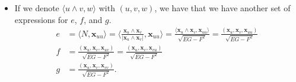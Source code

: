 \documentclass[10pt]{article}
\newcommand{\ve}[1]{\mathbf{#1}}
\begin{document}
\begin{itemize}
    \item If we denote $\langle u \wedge v, w \rangle$ with $(u,v,w)$, we have that we have another set of expressions for $e$, $f$, and $g$.
    \begin{align*}
      e 
      &= \langle N, \ve{x}_{uu} \rangle 
      = \bigg\langle \frac{\ve{x}_u \wedge \ve{x}_v}{|\ve{x}_u \wedge \ve{x}_v|}, \ve{x}_{uu} \bigg\rangle
      = \frac{\langle \ve{x}_u \wedge \ve{x}_v, \ve{x}_{uu} \rangle}{\sqrt{EG-F^2}}
      = \frac{(\ve{x}_u, \ve{x}_v, \ve{x}_{uu})}{\sqrt{EG-F^2}}\\
      f
      &= \frac{(\ve{x}_u, \ve{x}_v, \ve{x}_{uv})}{\sqrt{EG-F^2}}
      = \frac{(\ve{x}_u, \ve{x}_v, \ve{x}_{vu})}{\sqrt{EG-F^2}}\\
      g
      &= \frac{(\ve{x}_u, \ve{x}_v, \ve{x}_{vv})}{\sqrt{EG-F^2}}.
    \end{align*}
      
   
  \end{itemize}
 
\end{document}
